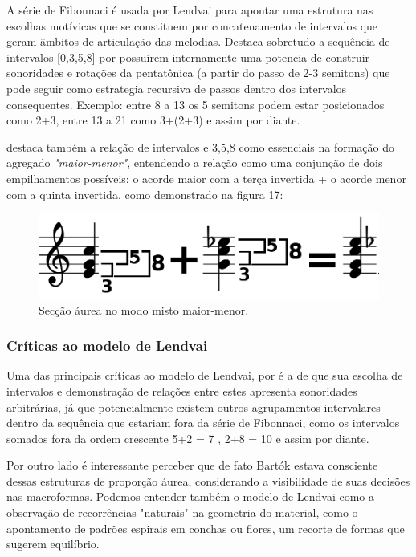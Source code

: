 \documentclass[
	12pt,				%
	openright,			%
	twoside,			%
	a4paper,			%
	english,			%
	french,				%
	spanish,			%
	brazil				%
	]{abntex2}
\begin{document}
A série de Fibonnaci é usada por Lendvai para apontar uma estrutura nas escolhas motívicas que se constituem por concatenamento de intervalos que geram âmbitos de articulação das melodias. Destaca sobretudo a sequência de intervalos [0,3,5,8] por possuírem internamente uma potencia de construir sonoridades e rotações da pentatônica (a partir do passo de 2-3 semitons) que pode seguir como estrategia recursiva de passos dentro dos intervalos consequentes. Exemplo: entre 8 a 13 os 5 semitons podem estar posicionados como 2+3, entre 13 a 21 como 3+(2+3) e assim por diante.

 destaca também a relação de intervalos e 3,5,8 como essenciais na formação do agregado \textit{"maior-menor"}, entendendo a relação como uma conjunção de dois empilhamentos possíveis: o acorde maior com a terça invertida + o acorde menor com a quinta invertida, como demonstrado na figura 17:

\begin{figure}[!h]
	\caption{\label{fig_grafico}Secção áurea no modo misto maior-menor.  }
	\begin{center}
	    \includegraphics[scale=0.3]{axis/GS_maior_menor.png}
	\end{center}
\end{figure} 



\subsubsection{Críticas ao modelo de Lendvai}

Uma das principais críticas ao modelo de Lendvai, por  é a de que sua escolha de intervalos e demonstração de relações entre estes apresenta sonoridades arbitrárias, já que potencialmente existem outros agrupamentos intervalares dentro da sequência que estariam fora da série de Fibonnaci, como os intervalos somados fora da ordem crescente 5+2 = 7 , 2+8 = 10 e assim por diante.

Por outro lado é interessante perceber que de fato Bartók estava consciente dessas estruturas de proporção áurea, considerando a visibilidade de suas decisões nas macroformas. Podemos entender também o modelo de Lendvai como a observação de recorrências "naturais" na geometria do material, como o apontamento de padrões espirais em conchas ou flores, um recorte de formas que sugerem equilíbrio.
\end{document}
